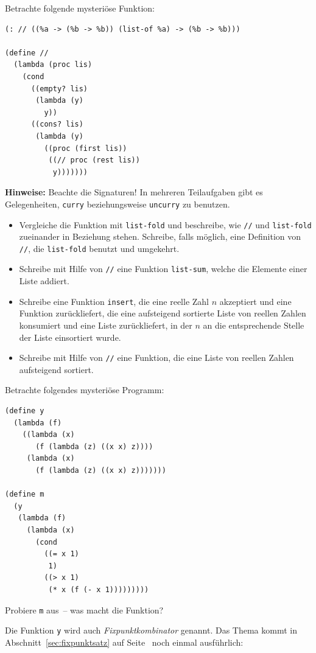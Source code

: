  \begin{aufgabe}
  Betrachte folgende mysteriöse Funktion:
\begin{lstlisting}
(: // ((%a -> (%b -> %b)) (list-of %a) -> (%b -> %b)))

(define //
  (lambda (proc lis)
    (cond
      ((empty? lis)
       (lambda (y)
         y))
      ((cons? lis)
       (lambda (y)
         ((proc (first lis))
          ((// proc (rest lis))
           y)))))))
\end{lstlisting}
  \textbf{Hinweise:} Beachte die Signaturen! In mehreren
  Teilaufgaben gibt es Gelegenheiten, \lstinline{curry} beziehungsweise
  \lstinline{uncurry} zu benutzen.

  \begin{itemize}
  \item Vergleiche die Funktion mit \lstinline{list-fold} und
    beschreibe, wie \lstinline{//} und \lstinline{list-fold} zueinander
    in Beziehung stehen.  Schreibe, falls möglich, eine
    Definition von \lstinline{//}, die \lstinline{list-fold} benutzt und
    umgekehrt.
  \item Schreibe mit Hilfe von \lstinline{//} eine Funktion
    \lstinline{list-sum}, welche die Elemente einer Liste addiert.
  \item Schreibe eine Funktion \lstinline{insert}, die eine reelle
    Zahl $n$ akzeptiert und eine Funktion zurückliefert, die eine
    aufsteigend sortierte Liste von reellen Zahlen konsumiert und
    eine Liste zurückliefert, in der $n$ an die entsprechende
    Stelle der Liste einsortiert wurde.
  \item Schreibe mit Hilfe von \lstinline{//} eine Funktion, die
    eine Liste von reellen Zahlen aufsteigend sortiert.
  \end{itemize}
\end{aufgabe}


\begin{aufgabe}
  Betrachte folgendes mysteriöse Programm:
  \begin{lstlisting}
(define y
  (lambda (f)
    ((lambda (x)
       (f (lambda (z) ((x x) z))))
     (lambda (x)
       (f (lambda (z) ((x x) z)))))))

(define m
  (y
   (lambda (f)
     (lambda (x)
       (cond
         ((= x 1)
          1)
         ((> x 1)
          (* x (f (- x 1)))))))))
   \end{lstlisting}
  Probiere \lstinline{m} aus~-- was macht die Funktion?

  Die Funktion \lstinline{y}
  wird auch \textit{Fixpunktkombinator}
  genannt.  Das Thema kommt in Abschnitt~\ref{sec:fixpunktsatz} auf
  Seite~\pageref{sec:fixpunktsatz} noch einmal ausführlich:
 \end{aufgabe}

